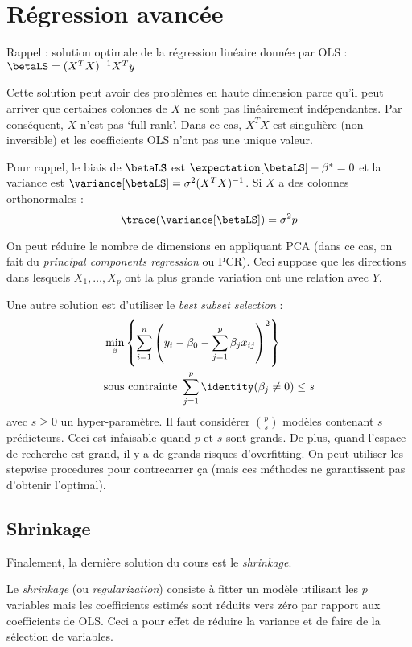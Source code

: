\section{Régression avancée}
    Rappel : solution optimale de la régression linéaire donnée par OLS : \(\betaLS = (X^TX)^{-1} X^Ty\)

    Cette solution peut avoir des problèmes en haute dimension parce qu'il peut arriver que certaines colonnes de \(X\) ne sont pas linéairement indépendantes. Par conséquent, \(X\) n'est pas `full rank'. Dans ce cas, \(X^T X\) est singulière (non-inversible) et les coefficients OLS n'ont pas une unique valeur.

    Pour rappel, le biais de \(\betaLS\) est \(\expectation[\betaLS] - \beta^* = 0\) et la variance est \(\variance[\betaLS] = \sigma^2 (X^T X)^{-1}\). Si \(X\) a des colonnes orthonormales :
    \[
        \trace(\variance[\betaLS]) = \sigma^2 p
    \]

    On peut réduire le nombre de dimensions en appliquant PCA (dans ce cas, on fait du \textit{principal components regression} ou PCR). Ceci suppose que les directions dans lesquels \(X_1, \dots, X_p\) ont la plus grande variation ont une relation avec \(Y\).

    Une autre solution est d'utiliser le \textit{best subset selection} :
    \begin{align*}
        &\min_{\beta} \left\{\sum_{i=1}^n \left(y_i - \beta_0 - \sum_{j=1}^p \beta_j x_{ij}\right)^2\right\}\\
        &\text{sous contrainte } \sum_{j=1}^p \identity(\beta_j \not= 0) \leq s
    \end{align*}
    avec \(s \geq 0\) un hyper-paramètre. Il faut considérer \(p \choose s\) modèles contenant \(s\) prédicteurs. Ceci est infaisable quand \(p\) et \(s\) sont grands. De plus, quand l'espace de recherche est grand, il y a de grands risques d'overfitting. On peut utiliser les stepwise procedures pour contrecarrer ça (mais ces méthodes ne garantissent pas d'obtenir l'optimal).

    \subsection{Shrinkage}
        Finalement, la dernière solution du cours est le \textit{shrinkage}.
        \begin{definition}
            Le \textit{shrinkage} (ou \textit{regularization}) consiste à fitter un modèle utilisant les \(p\) variables mais les coefficients estimés sont réduits vers zéro par rapport aux coefficients de OLS. Ceci a pour effet de réduire la variance et de faire de la sélection de variables.
        \end{definition}

